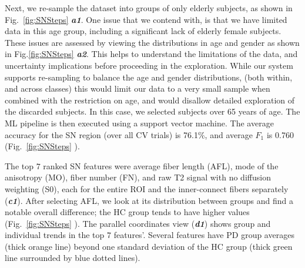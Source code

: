 Next, we re-sample the dataset into groups of only elderly subjects, as shown in Fig.~\ref{fig:SNSteps}  \textbf{\textit{a1}}. One issue that we contend with, is that we have limited data in this age group, including a significant lack of elderly female subjects. These issues are assessed by viewing the distributions in age and gender as shown in Fig.\ref{fig:SNSteps}  \textbf{\textit{a2}}. This helps to understand the limitations of the data, and uncertainty implications before proceeding in the exploration. While our system supports re-sampling to balance the age and gender distributions, (both within, and across classes) this would limit our data to a very small sample when combined with the restriction on age, and would disallow detailed exploration of the discarded subjects. In this case, we selected subjects over 65 years of age. The ML pipeline is then executed using a support vector machine. The average accuracy for the SN region (over all CV trials) is 76.1\%, and average $F_1$ is 0.760 (Fig.~\ref{fig:SNSteps} ). 


The top $7$ ranked SN features were average fiber length (AFL), mode of the anisotropy (MO), fiber number (FN), and raw T2 signal with no diffusion weighting (S0), each for the entire ROI and the inner-connect fibers separately (\textbf{\textit{c1}}). After selecting AFL, we look at its distribution between groups and find a notable overall difference; the HC group tends to have higher values (Fig.~\ref{fig:SNSteps} ). The parallel coordinates view (\textbf{\textit{d1}}) shows group and individual trends in the top $7$ features'. Several features have PD group averages (thick orange line) beyond one standard deviation of the HC group (thick green line surrounded by blue dotted lines).

